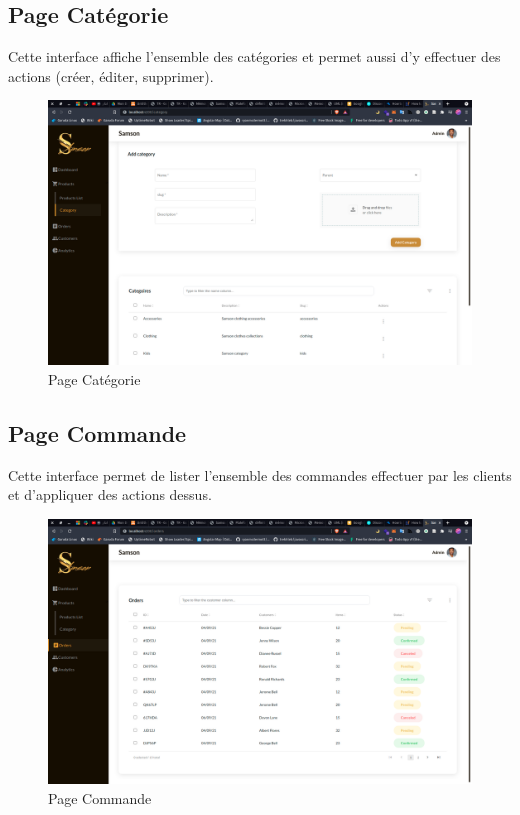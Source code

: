 \documentclass[a4paper, 12pt]{report}
\begin{document}
\subsection{Page Catégorie}
Cette interface affiche l'ensemble des catégories et permet aussi d'y effectuer des actions (créer, éditer, supprimer).
\begin{figure}[H]
    \centering
    \includegraphics[width = 1\linewidth]{img/categorie.png}
    \caption{Page Catégorie}
\end{figure}

\subsection{Page Commande}
Cette interface permet de lister l'ensemble des commandes effectuer par les clients et d'appliquer des actions dessus.
\begin{figure}[H]
    \centering
    \includegraphics[width = 1\linewidth]{img/order.png}
    \caption{Page Commande}
\end{figure}
\end{document}
